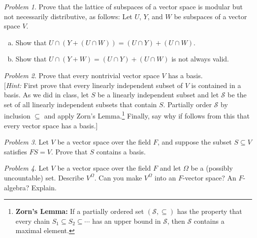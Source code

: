 \documentclass[11pt]{paper}
\theoremstyle{remark}
\newtheorem{problem}{Problem}
\newcommand{\<}{\ensuremath{\langle}}
\renewcommand{\>}{\ensuremath{\rangle}}
\newcommand{\sS}{\ensuremath{\mathscr{S}}}
\begin{document}
\probskip

\begin{problem}
Prove that the lattice of subspaces of a vector space
is modular but not necessarily distributive, as follows:
Let $U$, $Y$, and $W$ be subspaces of a vector space $V$. 
\begin{enumerate}[(a)]
\item Show that $U\cap (Y + (U \cap W)) = (U \cap Y) + (U \cap W)$.
\item Show that $U \cap (Y + W) = (U \cap Y) + (U \cap W)$ is not always valid.
\end{enumerate}
\end{problem}

\probskip

\begin{problem}
\label{prob:zorn}
Prove that every nontrivial vector space $V$ has a basis.\\[4pt]
[{\it Hint:} First prove that
every linearly independent subset of $V$ is contained in a basis.
As we did in class, let $S$ be a linearly independent subset and
  let $\sS$ be the set of all linearly independent subsets that contain $S$. 
  Partially order $\sS$ by inclusion $\subseteq$ and apply
  Zorn's Lemma.\footnote{{\bf Zorn's Lemma:} 
    If a partially ordered set $(\sS, \subseteq)$ has the property that every
    chain $S_1 \subseteq S_2 \subseteq \cdots$ has an upper bound in $\sS$, 
    then $\sS$ contains a maximal element.}
  Finally, say why if follows from this that every vector space has a basis.]
\end{problem}

\probskip

\begin{problem}
Let $V$ be a vector space over the field $F$, and suppose the subset 
$S \subseteq V$ satisfies $FS = V$. Prove that $S$ contains a basis.
\end{problem}

\probskip

\begin{problem}
Let $V$ be a vector space over the field $F$ and let $\Omega$ be a (possibly
uncountable) set.  Describe $V^\Omega$.  Can you make 
$V^\Omega$ into an  $F$-vector space?  An $F$-algebra? Explain.
\end{problem}
\end{document}
